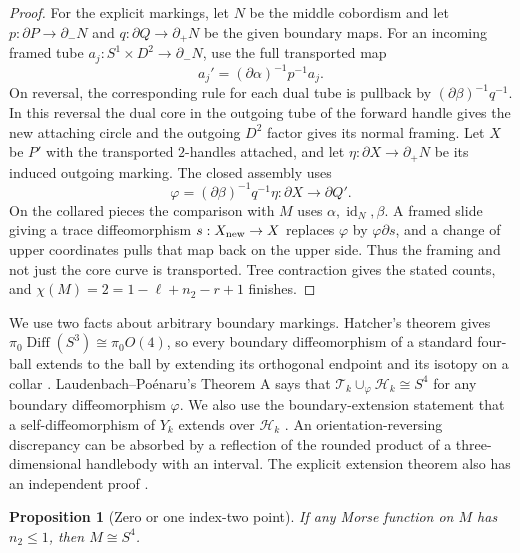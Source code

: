 \documentclass[11pt,letterpaper]{article}
\numberwithin{equation}{section}
\newtheorem{proposition}[theorem]{Proposition}
\newcommand{\HB}[1]{\mathcal H_{#1}}
\newcommand{\TB}[1]{\mathcal T_{#1}}
\begin{document}
\begin{proof}
For the explicit markings, let \(N\) be the middle cobordism and let
\(p:\partial P\to\partial_-N\) and \(q:\partial Q\to\partial_+N\) be
the given boundary maps. For an incoming framed tube
\(a_j:S^1\times D^2\to\partial_-N\), use the full transported map
\[
 a_j'=(\partial\alpha)^{-1}p^{-1}a_j .
\]
On reversal, the corresponding rule for each dual tube is pullback by
\((\partial\beta)^{-1}q^{-1}\). In this reversal the dual core in the
outgoing tube of the forward handle gives the new attaching circle
and the outgoing \(D^2\) factor gives its normal framing. Let \(X\)
be \(P'\) with the transported \(2\)-handles attached, and let
\(\eta:\partial X\to\partial_+N\) be its induced outgoing marking.
The closed assembly uses
\[
 \varphi=(\partial\beta)^{-1}q^{-1}\eta:\partial X\to\partial Q'.
\]
On the collared pieces the comparison with \(M\) uses
\(\alpha,\operatorname{id}_N,\beta\). A framed slide giving a trace
diffeomorphism \(s:X_{\rm new}\to X\) replaces \(\varphi\) by
\(\varphi\partial s\), and a change of upper coordinates pulls that
map back on the upper side. Thus the framing and not just the core
curve is transported. Tree contraction gives the stated counts,
and \(\chi(M)=2=1-\ell+n_2-r+1\) finishes.
\end{proof}

We use two facts about arbitrary boundary markings.
Hatcher's theorem gives \(\pi_0\operatorname{Diff}(S^3)\cong
\pi_0 O(4)\), so every boundary diffeomorphism of a standard
four-ball extends to the ball by extending its orthogonal endpoint
and its isotopy on a collar \cite[p.~553]{Hatcher1983Smale}.
Laudenbach--Po\'enaru's Theorem A says that
\(\TB{k}\cup_\varphi\HB{k}\cong S^4\) for any boundary
diffeomorphism \(\varphi\). We also use the boundary-extension
statement that a self-diffeomorphism of \(Y_k\) extends over
\(\HB{k}\) \cite[Theorem A and its proof, pp.~337, 341--342]{LaudenbachPoenaru1972Handlebodies}.
An orientation-reversing discrepancy can be absorbed by a
reflection of the rounded product of a three-dimensional handlebody
with an interval. The explicit extension theorem also has an
independent proof \cite[Theorem~2.5]{Moussard2026HandlebodyDiffeomorphisms}.

\begin{proposition}[Zero or one index-two point]\label{prop:one}
If any Morse function on \(M\) has \(n_2\leq1\), then
\(M\cong S^4\).
\end{proposition}
\end{document}
